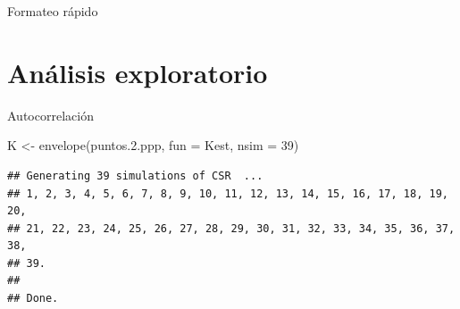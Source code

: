 \documentclass[
  11pt,
  ignorenonframetext,
]{beamer}
\newenvironment{Shaded}{}{}
\newcommand{\AttributeTok}[1]{\textcolor[rgb]{0.49,0.56,0.16}{#1}}
\newcommand{\DecValTok}[1]{\textcolor[rgb]{0.25,0.63,0.44}{#1}}
\newcommand{\FloatTok}[1]{\textcolor[rgb]{0.25,0.63,0.44}{#1}}
\newcommand{\FunctionTok}[1]{\textcolor[rgb]{0.02,0.16,0.49}{#1}}
\newcommand{\NormalTok}[1]{#1}
\newcommand{\OtherTok}[1]{\textcolor[rgb]{0.00,0.44,0.13}{#1}}
\newcommand{\SpecialCharTok}[1]{\textcolor[rgb]{0.25,0.44,0.63}{#1}}
\newcommand{\StringTok}[1]{\textcolor[rgb]{0.25,0.44,0.63}{#1}}
\begin{document}
\begin{frame}[fragile]{Formateo rápido}
\protect\hypertarget{formateo-ruxe1pido}{}
\begin{Shaded}
\end{Shaded}
\end{frame}

\hypertarget{anuxe1lisis-exploratorio}{%
\section{Análisis exploratorio}\label{anuxe1lisis-exploratorio}}

\begin{frame}[fragile]{Autocorrelación}
\protect\hypertarget{autocorrelaciuxf3n}{}
\begin{Shaded}
\begin{Highlighting}[]
\NormalTok{K }\OtherTok{\textless{}{-}} \FunctionTok{envelope}\NormalTok{(puntos.}\FloatTok{2.}\NormalTok{ppp, }\AttributeTok{fun =}\NormalTok{ Kest, }\AttributeTok{nsim =} \DecValTok{39}\NormalTok{)}
\end{Highlighting}
\end{Shaded}

\begin{verbatim}
## Generating 39 simulations of CSR  ...
## 1, 2, 3, 4, 5, 6, 7, 8, 9, 10, 11, 12, 13, 14, 15, 16, 17, 18, 19, 20,
## 21, 22, 23, 24, 25, 26, 27, 28, 29, 30, 31, 32, 33, 34, 35, 36, 37, 38, 
## 39.
## 
## Done.
\end{verbatim}
\end{frame}
\end{document}
